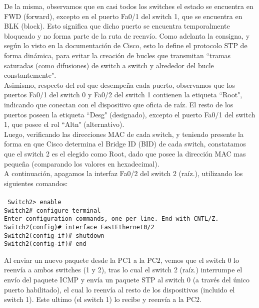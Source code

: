 \documentclass{article}
\begin{document}
De la misma, observamos que en casi todos los switches el estado se encuentra en FWD (forward), excepto en el puerto Fa0/1 del switch 1, que se encuentra en BLK (block). Esto significa que dicho puerto se encuentra temporalmente bloqueado y no forma parte de la ruta de reenvío. Como adelanta la consigna, y según lo visto en la documentación de Cisco, esto lo define el protocolo STP de forma dinámica, para evitar la creación de bucles que transmitan ``tramas saturadas (como difusiones) de switch a switch y alrededor del bucle constantemente". \\

Asimismo, respecto del rol que desempeña cada puerto, observamos que los puertos Fa0/1 del switch 0 y Fa0/2 del switch 1 contienen la etiqueta ``Root", indicando que conectan con el dispositivo que oficia de raíz. El resto de los puertos poseen la etiqueta ``Desg" (designado), excepto el puerto Fa0/1 del switch 1, que posee el rol ``Altn" (alternativo). \\

Luego, verificando las direcciones MAC de cada switch, y teniendo presente la forma en que Cisco determina el Bridge ID (BID) de cada switch, constatamos que el switch 2 es el elegido como Root, dado que posee la dirección MAC mas pequeña (comparando los valores en hexadecimal). \\

A continuación, apagamos la interfaz Fa0/2 del switch 2 (raíz.), utilizando los siguientes comandos: \\\\
\texttt{
    Switch2> \vspace{1} enable \\
    Switch2\# configure terminal  \\
    Enter configuration commands, one per line.  End with CNTL/Z. \\
    Switch2(config)\# interface FastEthernet0/2 \\
    Switch2(config-if)\# shutdown \\
    Switch2(config-if)\# end \\
}

Al enviar un nuevo paquete desde la PC1 a la PC2, vemos que el switch 0 lo reenvía a ambos switches (1 y 2), tras lo cual el switch 2 (raíz.) interrumpe el envío del paquete ICMP y envía un paquete STP al switch 0 (a través del único puerto habilitado), el cual lo reenvía al resto de los dispositivos (incluido el switch 1). Este ultimo (el switch 1) lo recibe y reenvía a la PC2. \\
\end{document}
